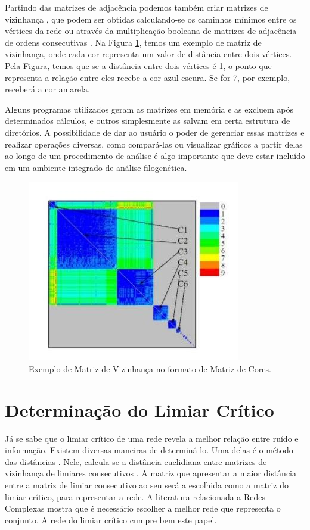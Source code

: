 Partindo das matrizes de adjacência podemos também criar matrizes de vizinhança \cite{andrade2009}, que podem ser obtidas calculando-se os caminhos mínimos
\cite{bessa2008} entre os vértices da rede ou através da multiplicação booleana de matrizes de adjacência de ordens consecutivas \cite{andrade2006}. Na Figura 
\ref{fig:matriz-vizinhanca}, temos um exemplo de matriz de vizinhança, onde cada cor representa um valor de distância entre dois vértices. Pela Figura, temos
que se a distância entre dois vértices é 1, o ponto que representa a relação entre eles recebe a cor azul escura. Se for 7, por exemplo, receberá a cor
amarela.

Alguns programas utilizados geram as matrizes em memória e as excluem após determinados cálculos, e outros simplesmente as salvam em certa estrutura
de diretórios. A possibilidade de dar ao usuário o poder de gerenciar essas matrizes e realizar operações diversas, como compará-las ou visualizar gráficos
a partir delas ao longo de um procedimento de análise é algo importante que deve estar incluído em um ambiente integrado de análise filogenética.

\begin{figure}
\centering
\includegraphics[scale=0.53]{matriz-vizinhanca}
\caption{Exemplo de Matriz de Vizinhança no formato de Matriz de Cores.}
\label{fig:matriz-vizinhanca}
\end{figure}

\section{Determinação do Limiar Crítico} \label{sec:limcrit}

Já se sabe que o limiar crítico de uma rede revela a melhor relação entre ruído e informação. Existem diversas maneiras de determiná-lo.
Uma delas é o método das distâncias \cite{andrade2009}. Nele, calcula-se a distância euclidiana entre matrizes de
vizinhança de limiares consecutivos \cite{andrade2011}. A matriz que apresentar a maior distância entre a matriz de limiar consecutivo
ao seu será a escolhida como a matriz do limiar crítico, para representar a rede. A literatura relacionada a Redes Complexas mostra que é necessário
escolher a melhor rede que representa o conjunto.
A rede do limiar crítico cumpre bem este papel.


